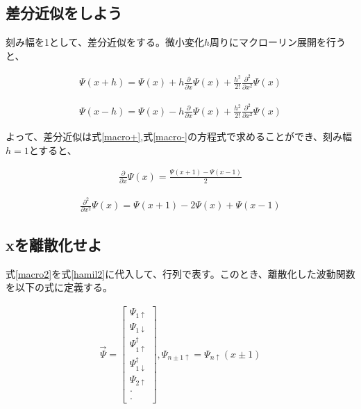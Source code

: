 \documentclass{jsarticle}
\begin{document}
		\subsection{差分近似をしよう}
		刻み幅を1として、差分近似をする。微小変化$h$周りにマクローリン展開を行うと、

		\begin{align}
			\Psi\left(x+h\right)=\Psi\left(x\right)+h\frac{\partial}{\partial x}\Psi\left(x\right)+\frac{h^2}{2!}\frac{\partial^2}{\partial x^2}\Psi\left(x\right)
			\label{macro+}
		\end{align}

		\begin{align}
			\Psi\left(x-h\right)=\Psi\left(x\right)-h\frac{\partial}{\partial x}\Psi\left(x\right)+\frac{h^2}{2!}\frac{\partial^2}{\partial x^2}\Psi\left(x\right)
			\label{macro-}
		\end{align}

		よって、差分近似は式\eqref{macro+},式\eqref{macro-}の方程式で求めることができ、刻み幅$h=1$とすると、

		\begin{align}
			\frac{\partial}{\partial x}\Psi\left(x\right)=
			\frac{\Psi\left(x+1\right)-\Psi\left(x-1\right)}{2}
		\end{align}

		\begin{align}
			\frac{\partial^2}{\partial x^2}\Psi\left(x\right)=
			\Psi\left(x+1\right)-2\Psi\left(x\right)+\Psi\left(x-1\right)
			\label{macro2}
		\end{align}

		\subsection{xを離散化せよ}
		式\eqref{macro2}を式\eqref{hamil2}に代入して、行列で表す。このとき、離散化した波動関数を以下の式に定義する。

		\begin{align}
			\vec{\Psi}=
			\begin{bmatrix}
				\Psi_{1\uparrow} \\
				\Psi_{1\downarrow} \\
				\Psi_{1\uparrow}^\dagger \\
				\Psi_{1\downarrow}^\dagger \\
				\Psi_{2\uparrow} \\
				\cdot \\
				\cdot
			\end{bmatrix},
			\Psi_{n\pm 1\uparrow}=\Psi_{n\uparrow}\left(x\pm 1\right)
		\end{align}
\end{document}
